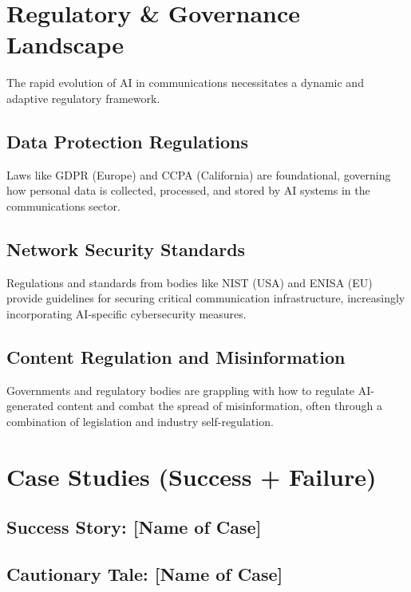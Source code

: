 \section{Regulatory \& Governance Landscape}
The rapid evolution of AI in communications necessitates a dynamic and adaptive regulatory framework.

\subsection{Data Protection Regulations}
Laws like GDPR (Europe) and CCPA (California) are foundational, governing how personal data is collected, processed, and stored by AI systems in the communications sector.

\subsection{Network Security Standards}
Regulations and standards from bodies like NIST (USA) and ENISA (EU) provide guidelines for securing critical communication infrastructure, increasingly incorporating AI-specific cybersecurity measures.

\subsection{Content Regulation and Misinformation}
Governments and regulatory bodies are grappling with how to regulate AI-generated content and combat the spread of misinformation, often through a combination of legislation and industry self-regulation.

\section{Case Studies (Success + Failure)}

\subsection{Success Story: [Name of Case]}

\subsection{Cautionary Tale: [Name of Case]}

